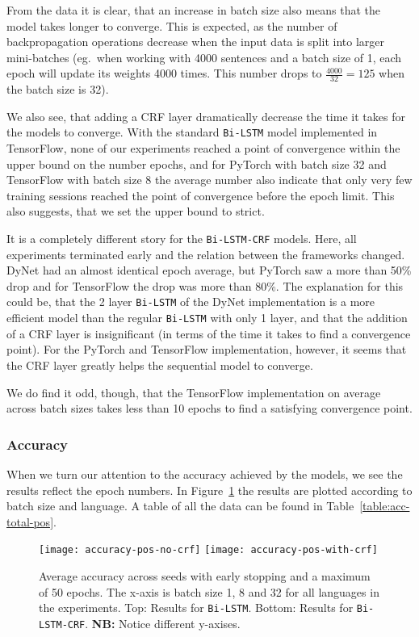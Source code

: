 From the data it is clear, that an increase in batch size also means that the
model takes longer to converge. This is expected, as the number of
backpropagation operations decrease when the input data is split into larger
mini-batches (eg.\ when working with 4000 sentences and a batch size of 1, each
epoch will update its weights 4000 times. This number drops to
$\frac{4000}{32}=125$ when the batch size is 32).

We also see, that adding a CRF layer dramatically decrease the time it takes for
the models to converge. With the standard \texttt{Bi-LSTM} model implemented in
TensorFlow, none of our experiments reached a point of convergence within the
upper bound on the number epochs, and for PyTorch with batch size 32 and
TensorFlow with batch size 8 the average number also indicate that only very few
training sessions reached the point of convergence before the epoch limit. This
also suggests, that we set the upper bound to strict.

It is a completely different story for the \texttt{Bi-LSTM-CRF} models. Here,
all experiments terminated early and the relation between the frameworks
changed.  DyNet had an almost identical epoch average, but PyTorch saw a more
than 50\% drop and for TensorFlow the drop was more than 80\%. The explanation
for this could be, that the 2 layer \texttt{Bi-LSTM} of the DyNet implementation
is a more efficient model than the regular \texttt{Bi-LSTM} with only 1 layer,
and that the addition of a CRF layer is insignificant (in terms of the time it
takes to find a convergence point). For the PyTorch and TensorFlow
implementation, however, it seems that the CRF layer greatly helps the
sequential model to converge.

We do find it odd, though, that the TensorFlow implementation on average across
batch sizes takes less than 10 epochs to find a satisfying convergence point.

\subsubsection*{Accuracy}

When we turn our attention to the accuracy achieved by the models, we see the
results reflect the epoch numbers. In
Figure~\ref{chart:acc-by-batch-and-lang-pos} the results are plotted
according to batch size and language. A table of all the data can be found in
Table~\ref{table:acc-total-pos}.

\begin{figure}[h!]
    \texttt{[image: accuracy-pos-no-crf]}
    \texttt{[image: accuracy-pos-with-crf]}
    \caption{Average accuracy across seeds with early stopping and a maximum of
        50 epochs. The x-axis is batch size 1, 8 and 32 for all languages in the
        experiments. Top: Results for \texttt{Bi-LSTM}. Bottom: Results for
    \texttt{Bi-LSTM-CRF}. \textbf{NB:} Notice different y-axises.
    }\label{chart:acc-by-batch-and-lang-pos}
\end{figure}

